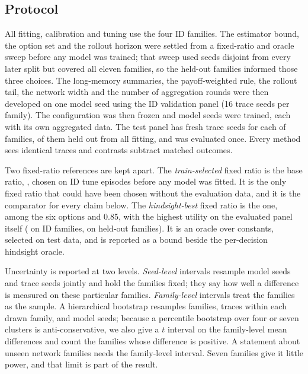 \documentclass[10pt]{article}
\begin{document}
\subsection{Protocol}
All fitting, calibration and tuning use the four ID families. The estimator bound, the option set and the rollout horizon were settled from a fixed-ratio and oracle sweep before any model was trained; that sweep used seeds disjoint from every later split but covered all eleven families, so the held-out families informed those three choices. The long-memory summaries, the payoff-weighted rule, the rollout tail, the network width and the number of aggregation rounds were then developed on one model seed using the ID validation panel (16 trace seeds per family). The configuration was then frozen and \TypedModelSeeds{} model seeds were trained, each with its own aggregated data. The test panel has \TypedTraceSeeds{} fresh trace seeds for each of \TypedScenarios{} families, \TypedOodScenarios{} of them held out from all fitting, and was evaluated once. Every method sees identical traces and contrasts subtract matched outcomes.

Two fixed-ratio references are kept apart. The \emph{train-selected} fixed ratio is the base ratio, \TypedBaseRatio{}, chosen on ID tune episodes before any model was fitted. It is the only fixed ratio that could have been chosen without the evaluation data, and it is the comparator for every claim below. The \emph{hindsight-best} fixed ratio is the one, among the six options and 0.85, with the highest utility on the evaluated panel itself (\TypedAuditIdHindsightFixedRatio{} on ID families, \TypedAuditOodHindsightFixedRatio{} on held-out families). It is an oracle over constants, selected on test data, and is reported as a bound beside the per-decision hindsight oracle.

Uncertainty is reported at two levels. \emph{Seed-level} intervals resample model seeds and trace seeds jointly and hold the families fixed; they say how well a difference is measured on these particular families. \emph{Family-level} intervals treat the families as the sample. A hierarchical bootstrap resamples families, traces within each drawn family, and model seeds; because a percentile bootstrap over four or seven clusters is anti-conservative, we also give a $t$ interval on the family-level mean differences and count the families whose difference is positive. A statement about unseen network families needs the family-level interval. Seven families give it little power, and that limit is part of the result.
\end{document}

